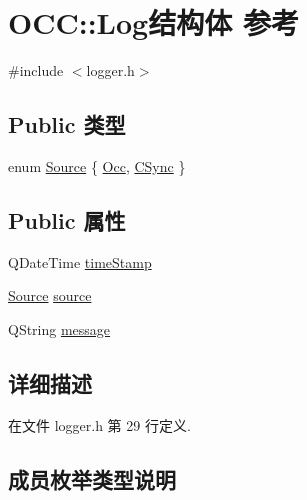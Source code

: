 \hypertarget{struct_o_c_c_1_1_log}{}\section{O\+CC\+:\+:Log结构体 参考}
\label{struct_o_c_c_1_1_log}


{\ttfamily \#include $<$logger.\+h$>$}

\subsection*{Public 类型}
\begin{DoxyCompactItemize}
\item 
enum \hyperlink{struct_o_c_c_1_1_log_a7beafa4ce173549262107825d800c1b4}{Source} \{ \hyperlink{struct_o_c_c_1_1_log_a7beafa4ce173549262107825d800c1b4a92f9422782335ff8e082c64a31e1f205}{Occ}, 
\hyperlink{struct_o_c_c_1_1_log_a7beafa4ce173549262107825d800c1b4aa908cd1aac00926b74abe95073542b9a}{C\+Sync}
 \}
\end{DoxyCompactItemize}
\subsection*{Public 属性}
\begin{DoxyCompactItemize}
\item 
Q\+Date\+Time \hyperlink{struct_o_c_c_1_1_log_a4a1f4cb2f82627aafbc994e9f2062acb}{time\+Stamp}
\item 
\hyperlink{struct_o_c_c_1_1_log_a7beafa4ce173549262107825d800c1b4}{Source} \hyperlink{struct_o_c_c_1_1_log_a8101d22292f1819a1426bb1cda78fc8f}{source}
\item 
Q\+String \hyperlink{struct_o_c_c_1_1_log_a6acb4ed141aef4fb35b9b925c1e3fe4f}{message}
\end{DoxyCompactItemize}


\subsection{详细描述}


在文件 logger.\+h 第 29 行定义.



\subsection{成员枚举类型说明}
\mbox{\label{struct_o_c_c_1_1_log_a7beafa4ce173549262107825d800c1b4}} 
